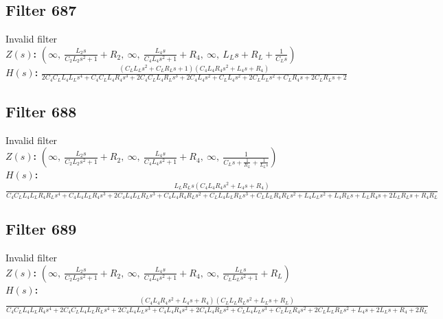 \documentclass{article}
\begin{document}
\subsection*{Filter 687}
Invalid filter \\ 
\textbf{$Z(s)$:} $\left( \infty, \  \frac{L_{2} s}{C_{2} L_{2} s^{2} + 1} + R_{2}, \  \infty, \  \frac{L_{4} s}{C_{4} L_{4} s^{2} + 1} + R_{4}, \  \infty, \  L_{L} s + R_{L} + \frac{1}{C_{L} s}\right)$ \\ 
\textbf{$H(s)$:} $\frac{\left(C_{L} L_{L} s^{2} + C_{L} R_{L} s + 1\right) \left(C_{4} L_{4} R_{4} s^{2} + L_{4} s + R_{4}\right)}{2 C_{4} C_{L} L_{4} L_{L} s^{4} + C_{4} C_{L} L_{4} R_{4} s^{3} + 2 C_{4} C_{L} L_{4} R_{L} s^{3} + 2 C_{4} L_{4} s^{2} + C_{L} L_{4} s^{2} + 2 C_{L} L_{L} s^{2} + C_{L} R_{4} s + 2 C_{L} R_{L} s + 2}$ \\ 
\subsection*{Filter 688}
Invalid filter \\ 
\textbf{$Z(s)$:} $\left( \infty, \  \frac{L_{2} s}{C_{2} L_{2} s^{2} + 1} + R_{2}, \  \infty, \  \frac{L_{4} s}{C_{4} L_{4} s^{2} + 1} + R_{4}, \  \infty, \  \frac{1}{C_{L} s + \frac{1}{R_{L}} + \frac{1}{L_{L} s}}\right)$ \\ 
\textbf{$H(s)$:} $\frac{L_{L} R_{L} s \left(C_{4} L_{4} R_{4} s^{2} + L_{4} s + R_{4}\right)}{C_{4} C_{L} L_{4} L_{L} R_{4} R_{L} s^{4} + C_{4} L_{4} L_{L} R_{4} s^{3} + 2 C_{4} L_{4} L_{L} R_{L} s^{3} + C_{4} L_{4} R_{4} R_{L} s^{2} + C_{L} L_{4} L_{L} R_{L} s^{3} + C_{L} L_{L} R_{4} R_{L} s^{2} + L_{4} L_{L} s^{2} + L_{4} R_{L} s + L_{L} R_{4} s + 2 L_{L} R_{L} s + R_{4} R_{L}}$ \\ 
\subsection*{Filter 689}
Invalid filter \\ 
\textbf{$Z(s)$:} $\left( \infty, \  \frac{L_{2} s}{C_{2} L_{2} s^{2} + 1} + R_{2}, \  \infty, \  \frac{L_{4} s}{C_{4} L_{4} s^{2} + 1} + R_{4}, \  \infty, \  \frac{L_{L} s}{C_{L} L_{L} s^{2} + 1} + R_{L}\right)$ \\ 
\textbf{$H(s)$:} $\frac{\left(C_{4} L_{4} R_{4} s^{2} + L_{4} s + R_{4}\right) \left(C_{L} L_{L} R_{L} s^{2} + L_{L} s + R_{L}\right)}{C_{4} C_{L} L_{4} L_{L} R_{4} s^{4} + 2 C_{4} C_{L} L_{4} L_{L} R_{L} s^{4} + 2 C_{4} L_{4} L_{L} s^{3} + C_{4} L_{4} R_{4} s^{2} + 2 C_{4} L_{4} R_{L} s^{2} + C_{L} L_{4} L_{L} s^{3} + C_{L} L_{L} R_{4} s^{2} + 2 C_{L} L_{L} R_{L} s^{2} + L_{4} s + 2 L_{L} s + R_{4} + 2 R_{L}}$ \\ 
\end{document}
